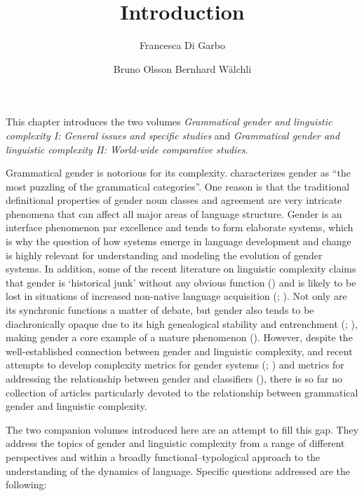\documentclass[output=collectionpaper]{langsci/langscibook}
\title{Introduction}
\author{%
Francesca Di Garbo%
\affiliation{Stockholm University}%
\and%
Bruno Olsson%
\affiliation{Australian National University}%
\lastand%
Bernhard Wälchli%
\affiliation{Stockholm University}%
}
\begin{document}
\noindent%
This chapter introduces the two volumes \textit{Grammatical gender and linguistic complexity I: General issues and specific studies} and \textit{Grammatical gender and linguistic complexity II: World-wide comparative studies}.

Grammatical gender is notorious for its complexity. \citet[1]{Corbett1991} characterizes gender as ``the most puzzling of the grammatical categories''. One reason is that the traditional definitional properties of gender \textendash{} noun classes and agreement \textendash{} are very intricate phenomena that can affect all major areas of language structure. Gender is an interface phenomenon par excellence and tends to form elaborate systems, which is why the question of how systems emerge in language development and change is highly relevant for understanding and modeling the evolution of gender systems. In addition, some of the recent literature on linguistic complexity claims that gender is `historical junk’ without any obvious function (\citealt[156]{Trudgill2011}) and is likely to be lost in situations of increased non-native language acquisition (\citealt{McWhorter2001,McWhorter2007}; \citealt{Trudgill1999}). Not only are its synchronic functions a matter of debate, but gender also tends to be diachronically opaque due to its high genealogical stability and entrenchment (\citealt[142]{Nichols1992}; \citealt{Nichols2003}), making gender a core example of a mature phenomenon (\citealt{Dahl2004}). However, despite the well-established connection between gender and linguistic complexity, and recent attempts to develop complexity metrics for gender systems (\citealt{Audring2014,Audring2017}; \citealt{DiGarbo2016}) and metrics for addressing the relationship between gender and classifiers (\citealt{Passer2016b}), there is so far no collection of articles particularly devoted to the relationship between grammatical gender and linguistic complexity.

The two companion volumes introduced here are an attempt to fill this gap. They address the topics of gender and linguistic complexity from a range of different perspectives and within a broadly functional--typological approach to the understanding of the dynamics of language. Specific questions addressed are the following:
\end{document}
